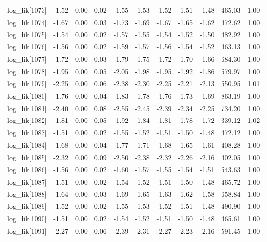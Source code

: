 \begin{table}[ht]
\begin{tabular}{rrrrrrrrrrr}
  log\_lik[1073] & -1.52 & 0.00 & 0.02 & -1.55 & -1.53 & -1.52 & -1.51 & -1.48 & 465.03 & 1.00 \\ 
  log\_lik[1074] & -1.67 & 0.00 & 0.03 & -1.73 & -1.69 & -1.67 & -1.65 & -1.62 & 472.62 & 1.00 \\ 
  log\_lik[1075] & -1.54 & 0.00 & 0.02 & -1.57 & -1.55 & -1.54 & -1.52 & -1.50 & 482.92 & 1.00 \\ 
  log\_lik[1076] & -1.56 & 0.00 & 0.02 & -1.59 & -1.57 & -1.56 & -1.54 & -1.52 & 463.13 & 1.00 \\ 
  log\_lik[1077] & -1.72 & 0.00 & 0.03 & -1.79 & -1.75 & -1.72 & -1.70 & -1.66 & 684.30 & 1.00 \\ 
  log\_lik[1078] & -1.95 & 0.00 & 0.05 & -2.05 & -1.98 & -1.95 & -1.92 & -1.86 & 579.97 & 1.00 \\ 
  log\_lik[1079] & -2.25 & 0.00 & 0.06 & -2.38 & -2.30 & -2.25 & -2.21 & -2.13 & 550.95 & 1.01 \\ 
  log\_lik[1080] & -1.76 & 0.00 & 0.04 & -1.83 & -1.78 & -1.76 & -1.73 & -1.69 & 863.19 & 1.00 \\ 
  log\_lik[1081] & -2.40 & 0.00 & 0.08 & -2.55 & -2.45 & -2.39 & -2.34 & -2.25 & 734.20 & 1.00 \\ 
  log\_lik[1082] & -1.81 & 0.00 & 0.05 & -1.92 & -1.84 & -1.81 & -1.78 & -1.72 & 339.12 & 1.02 \\ 
  log\_lik[1083] & -1.51 & 0.00 & 0.02 & -1.55 & -1.52 & -1.51 & -1.50 & -1.48 & 472.12 & 1.00 \\ 
  log\_lik[1084] & -1.68 & 0.00 & 0.04 & -1.77 & -1.71 & -1.68 & -1.65 & -1.61 & 408.28 & 1.00 \\ 
  log\_lik[1085] & -2.32 & 0.00 & 0.09 & -2.50 & -2.38 & -2.32 & -2.26 & -2.16 & 402.05 & 1.00 \\ 
  log\_lik[1086] & -1.56 & 0.00 & 0.02 & -1.60 & -1.57 & -1.55 & -1.54 & -1.51 & 543.63 & 1.00 \\ 
  log\_lik[1087] & -1.51 & 0.00 & 0.02 & -1.54 & -1.52 & -1.51 & -1.50 & -1.48 & 465.72 & 1.00 \\ 
  log\_lik[1088] & -1.64 & 0.00 & 0.03 & -1.69 & -1.65 & -1.63 & -1.62 & -1.58 & 658.84 & 1.00 \\ 
  log\_lik[1089] & -1.52 & 0.00 & 0.02 & -1.55 & -1.53 & -1.52 & -1.51 & -1.48 & 490.90 & 1.00 \\ 
  log\_lik[1090] & -1.51 & 0.00 & 0.02 & -1.54 & -1.52 & -1.51 & -1.50 & -1.48 & 465.61 & 1.00 \\ 
  log\_lik[1091] & -2.27 & 0.00 & 0.06 & -2.39 & -2.31 & -2.27 & -2.23 & -2.16 & 591.45 & 1.00 \\ 

\end{tabular}
\end{table}
